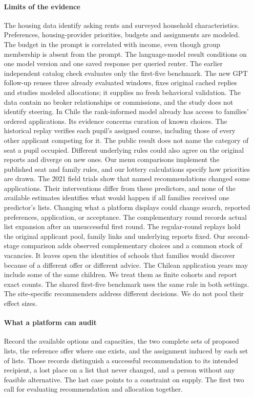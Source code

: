 \paragraph{Limits of the evidence}
The housing data identify asking rents and surveyed household characteristics. Preferences, housing-provider priorities, budgets and assignments are modeled. The budget in the prompt is correlated with income, even though group membership is absent from the prompt. The language-model result conditions on one model version and one saved response per queried renter. The earlier independent catalog check evaluates only the first-five benchmark. The new GPT follow-up reuses three already evaluated windows, fixes original cached replies and studies modeled allocations; it supplies no fresh behavioral validation. The data contain no broker relationships or commissions, and the study does not identify steering. In Chile the rank-informed model already has access to families' ordered applications. Its evidence concerns curation of known choices. The historical replay verifies each pupil's assigned course, including those of every other applicant competing for it. The public result does not name the category of seat a pupil occupied. Different underlying rules could also agree on the original reports and diverge on new ones. Our menu comparisons implement the published seat and family rules, and our lottery calculations specify how priorities are drawn. The 2021 field trials show that named recommendations changed some applications. Their interventions differ from these predictors, and none of the available estimates identifies what would happen if all families received one predictor's lists. Changing what a platform displays could change search, reported preferences, application, or acceptance. The complementary round records actual list expansion after an unsuccessful first round. The regular-round replays hold the original applicant pool, family links and underlying reports fixed. Our second-stage comparison adds observed complementary choices and a common stock of vacancies. It leaves open the identities of schools that families would discover because of a different offer or different advice. The Chilean application years may include some of the same children. We treat them as finite cohorts and report exact counts. The shared first-five benchmark uses the same rule in both settings. The site-specific recommenders address different decisions. We do not pool their effect sizes.

\paragraph{What a platform can audit}
Record the available options and capacities, the two complete sets of proposed lists, the reference offer where one exists, and the assignment induced by each set of lists. Those records distinguish a successful recommendation to its intended recipient, a lost place on a list that never changed, and a person without any feasible alternative. The last case points to a constraint on supply. The first two call for evaluating recommendation and allocation together.



